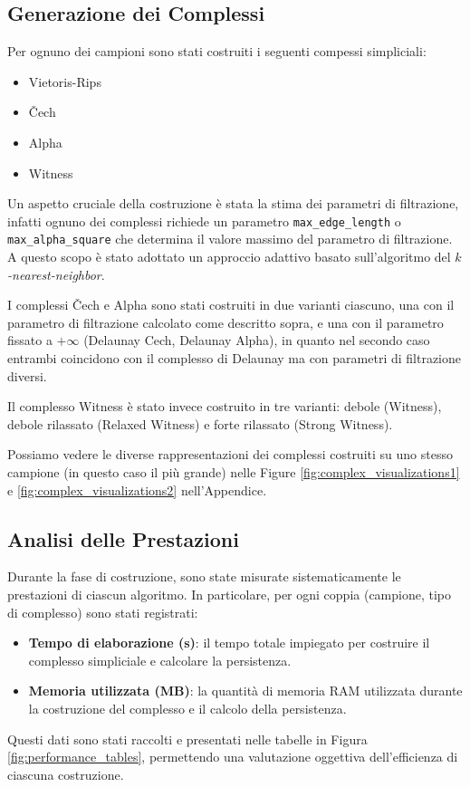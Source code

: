 \documentclass[a4paper, 12pt]{article}
\theoremstyle{definition}
\theoremstyle{remark}
\begin{document}
\subsection{Generazione dei Complessi}
Per ognuno dei campioni sono stati costruiti i seguenti compessi simpliciali:
\begin{itemize}
    \item Vietoris-Rips
    \item \v{C}ech
    \item Alpha
    \item Witness
\end{itemize}

Un aspetto cruciale della costruzione è stata la stima dei parametri di filtrazione, infatti ognuno dei complessi richiede un parametro \verb|max_edge_length| o \verb|max_alpha_square| che determina il valore massimo del parametro di filtrazione. A questo scopo è stato adottato un approccio adattivo basato sull'algoritmo del \textit{$k$-nearest-neighbor}.

I complessi \v{C}ech e Alpha sono stati costruiti in due varianti ciascuno, una con il parametro di filtrazione calcolato come descritto sopra, e una con il parametro fissato a $+\infty$ (Delaunay Cech, Delaunay Alpha), in quanto nel secondo caso entrambi coincidono con il complesso di Delaunay ma con parametri di filtrazione diversi.

Il complesso Witness è stato invece costruito in tre varianti: debole (Witness), debole rilassato (Relaxed Witness) e forte rilassato (Strong Witness).

Possiamo vedere le diverse rappresentazioni dei complessi costruiti su uno stesso campione (in questo caso il più grande) nelle Figure \ref{fig:complex_visualizations1} e \ref{fig:complex_visualizations2} nell'Appendice.

\subsection{Analisi delle Prestazioni}
Durante la fase di costruzione, sono state misurate sistematicamente le prestazioni di ciascun algoritmo. In particolare, per ogni coppia (campione, tipo di complesso) sono stati registrati:
\begin{itemize}
    \item \textbf{Tempo di elaborazione (s)}: il tempo totale impiegato per costruire il complesso simpliciale e calcolare la persistenza.
    \item \textbf{Memoria utilizzata (MB)}: la quantità di memoria RAM utilizzata durante la costruzione del complesso e il calcolo della persistenza.
\end{itemize}
Questi dati sono stati raccolti e presentati nelle tabelle in Figura \ref{fig:performance_tables}, permettendo una valutazione oggettiva dell'efficienza di ciascuna costruzione.
\end{document}

